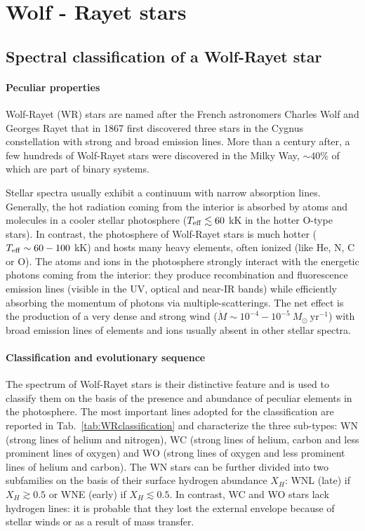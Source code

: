 \documentclass[a4paper,titlepage]{book}     	%
\newcommand{\sun}{\ensuremath{_\odot}}
\newcommand{\mdot}{\ensuremath{\dot{M}}}
\newcommand{\msun}{\ensuremath{M\sun}}
\newcommand{\yr}{\text{yr}}
\begin{document}
\section{Wolf - Rayet stars}
\subsection{Spectral classification of a Wolf-Rayet star}\label{subsec:WRclassification}
\paragraph{Peculiar properties} Wolf-Rayet (WR) stars are named after the French astronomers Charles Wolf and Georges Rayet that in 1867 first discovered three stars in the Cygnus constellation with strong and broad emission lines. More than a century after, a few hundreds of Wolf-Rayet stars were discovered in the Milky Way, $\sim 40 \%$ of which are part of binary systems.

Stellar spectra usually exhibit a continuum with narrow absorption lines. Generally, the hot radiation coming from the interior is absorbed by atoms and molecules in a cooler stellar photosphere ($T_{\rm eff} \lesssim 60$ kK in the hotter O-type stars). In contrast, the photosphere of Wolf-Rayet stars is much hotter ($T_{\rm eff} \sim 60 - 100$ kK) and hosts many heavy elements, often ionized (like He, N, C or O). The atoms and ions in the photosphere strongly interact with the energetic photons coming from the interior: they produce recombination and fluorescence emission lines (visible in the UV, optical and near-IR bands) while efficiently absorbing the momentum of photons via multiple-scatterings. The net effect is the production of a very dense and strong wind ($\mdot \sim 10^{-4}-10^{-5}~\msun~\yr^{-1}$) with broad emission lines of elements and ions usually absent in other stellar spectra.

\paragraph{Classification and evolutionary sequence}The spectrum of Wolf-Rayet stars is their distinctive feature and is used to classify them on the basis of the presence and abundance of peculiar elements in the photosphere. The most important lines adopted for the classification are reported in Tab.\ \ref{tab:WRclassification} and characterize the three sub-types: WN (strong lines of helium and nitrogen), WC (strong lines of helium, carbon and less prominent lines of oxygen) and WO (strong lines of oxygen and less prominent lines of helium and carbon). The WN stars can be further divided into two subfamilies on the basis of their surface hydrogen abundance $X_H$: WNL (late) if $X_H \gtrsim 0.5$ or WNE (early) if $X_H \lesssim 0.5$. In contrast, WC and WO stars lack hydrogen lines: it is probable that they lost the external envelope because of stellar winds or as a result of mass transfer.  
\end{document}
